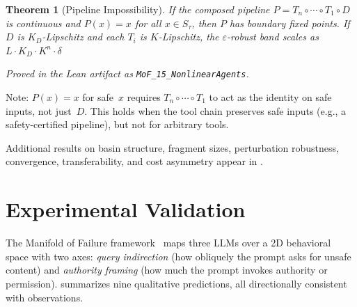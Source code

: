 \documentclass[11pt]{article}
\newtheorem{theorem}{Theorem}[section]
\begin{document}
\begin{theorem}[Pipeline Impossibility]
\label{thm:pipeline-impossible}
If the composed pipeline $P = T_n \circ \cdots \circ T_1 \circ D$ is
continuous and $P(x) = x$ for all $x \in S_\tau$, then $P$ has
boundary fixed points. If $D$ is $K_D$-Lipschitz and each $T_i$ is
$K$-Lipschitz, the $\varepsilon$-robust band scales as
$L \cdot K_D \cdot K^n \cdot \delta$
\end{theorem}

\noindent\emph{Proved in the Lean artifact as \textup{\texttt{MoF\_15\_NonlinearAgents}}.}

Note: $P(x) = x$ for safe~$x$ requires $T_n \circ \cdots \circ T_1$
to act as the identity on safe inputs, not just~$D$. This holds when
the tool chain preserves safe inputs (e.g., a safety-certified
pipeline), but not for arbitrary tools.


Additional results on basin structure, fragment sizes, perturbation robustness, convergence, transferability, and cost asymmetry appear in .


\section{Experimental Validation}
\label{sec:experiments}

The Manifold of
Failure framework~\cite{munshi2026manifold} maps three LLMs over a 2D
behavioral space with two axes: \emph{query indirection} (how obliquely
the prompt asks for unsafe content) and \emph{authority framing} (how
much the prompt invokes authority or permission).  summarizes
nine qualitative predictions, all directionally consistent with observations.
\end{document}
